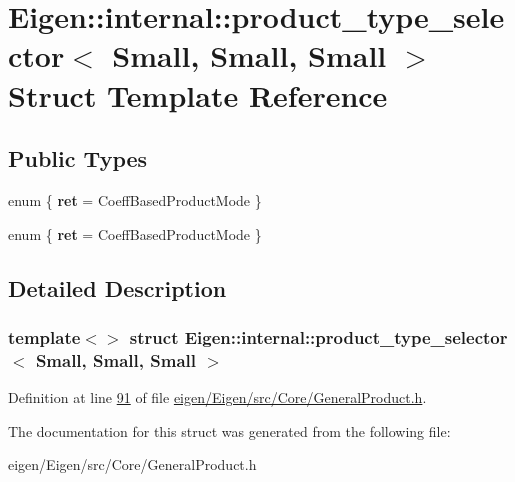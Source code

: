 \hypertarget{struct_eigen_1_1internal_1_1product__type__selector_3_01_small_00_01_small_00_01_small_01_4}{}\section{Eigen\+:\+:internal\+:\+:product\+\_\+type\+\_\+selector$<$ Small, Small, Small $>$ Struct Template Reference}
\label{struct_eigen_1_1internal_1_1product__type__selector_3_01_small_00_01_small_00_01_small_01_4}
\subsection*{Public Types}
\begin{DoxyCompactItemize}
\item 
\mbox{\label{struct_eigen_1_1internal_1_1product__type__selector_3_01_small_00_01_small_00_01_small_01_4_a28f0ff8f491c9fe11475f3922e468f9a}} 
enum \{ {\bfseries ret} = Coeff\+Based\+Product\+Mode
 \}
\item 
\mbox{\label{struct_eigen_1_1internal_1_1product__type__selector_3_01_small_00_01_small_00_01_small_01_4_a1c1c6eebebfabd73bb0621fa8a36da94}} 
enum \{ {\bfseries ret} = Coeff\+Based\+Product\+Mode
 \}
\end{DoxyCompactItemize}


\subsection{Detailed Description}
\subsubsection*{template$<$$>$\newline
struct Eigen\+::internal\+::product\+\_\+type\+\_\+selector$<$ Small, Small, Small $>$}



Definition at line \hyperlink{eigen_2_eigen_2src_2_core_2_general_product_8h_source_l00091}{91} of file \hyperlink{eigen_2_eigen_2src_2_core_2_general_product_8h_source}{eigen/\+Eigen/src/\+Core/\+General\+Product.\+h}.



The documentation for this struct was generated from the following file\+:\begin{DoxyCompactItemize}
\item 
eigen/\+Eigen/src/\+Core/\+General\+Product.\+h\end{DoxyCompactItemize}
